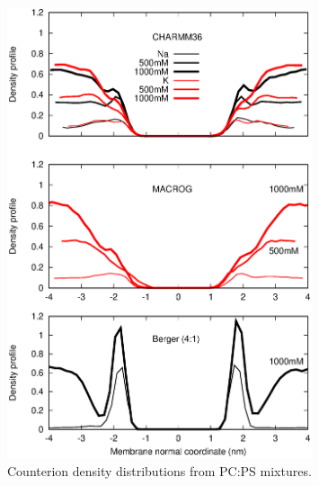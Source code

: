 \documentclass[journal=jpcbfk,manuscript=article]{achemso}
\begin{document}
\begin{figure}[]
  \centering
  \includegraphics[width=0.8\textwidth]{../Figs/CIdensPSOCmixt.eps}
  \caption{  Counterion density distributions from PC:PS mixtures.
\label{CIdensPSOCmixt}
  }
\end{figure}
\end{document}
